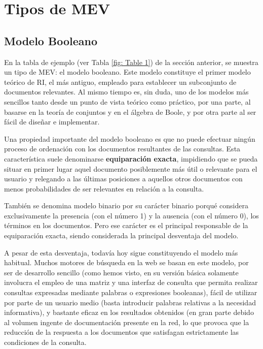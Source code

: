 \documentclass{article}
\begin{document}
\section{Tipos de MEV}

\subsection{Modelo Booleano}

En la tabla de ejemplo (ver Tabla \ref{fig: Table 1}) de la sección anterior, se muestra un tipo de MEV: el modelo booleano. Este modelo constituye el primer modelo teórico de RI, el más antiguo, empleado para establecer un subconjunto de documentos relevantes. Al mismo tiempo es, sin duda, uno de los modelos más sencillos tanto desde un punto de vista teórico como práctico, por una parte, al basarse en la teoría de conjuntos y en el álgebra de Boole, y por otra parte al ser fácil de diseñar e implementar.

Una propiedad importante del modelo booleano es que no puede efectuar ningún proceso de ordenación con los documentos resultantes de las consultas. Esta característica suele denominarse \textbf{equiparación exacta}, impidiendo que se pueda situar en primer lugar aquel documento posiblemente más útil o relevante para el usuario y relegando a las últimas posiciones a aquellos otros documentos con menos probabilidades de ser relevantes en relación a la consulta.

También se denomina modelo binario por su carácter binario porqué considera exclusivamente la presencia (con el número 1) y la ausencia (con el número 0), los términos en los documentos. Pero ese carácter es el principal responsable de la equiparación exacta, siendo considerada la principal desventaja del modelo. 

A pesar de esta desventaja, todavía hoy sigue constituyendo el modelo más habitual. Muchos motores de búsqueda en la web se basan en este modelo, por ser de desarrollo sencillo (como hemos visto, en su versión básica solamente involucra el empleo de una matriz y una interfaz de consulta que permita realizar consultas expresadas mediante palabras o expresiones booleanas), fácil de utilizar por parte de un usuario medio (basta introducir palabras relativas a la necesidad informativa), y bastante eficaz en los resultados obtenidos (en gran parte debido al volumen ingente de documentación presente en la red, lo que provoca que la reducción de la respuesta a los documentos que satisfagan estrictamente las condiciones de la consulta.
\end{document}
